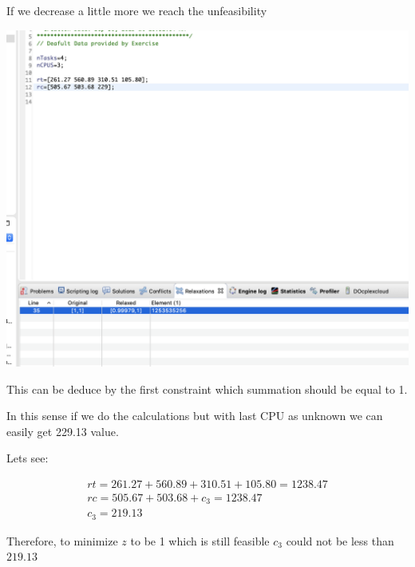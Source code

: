 \documentclass[12pt, a4paper]{article}
\begin{document}
If we decrease a little more we reach the unfeasibility

\includegraphics[width=\textwidth]{increase_unfesible}

This can be deduce by the first constraint which summation should be equal to 1.

In this sense if we do the calculations but with last CPU as unknown we can
easily get 229.13 value.

Lets see:

\begin{subequations}
  \begin{align}
  rt = 261.27 + 560.89 + 310.51 + 105.80 = 1238.47 \\
  rc = 505.67 + 503.68 + c_3 = 1238.47 \\
  c_3 = 219.13
  \end{align}
\end{subequations}

Therefore, to minimize $z$ to be 1 which is still feasible $c_3$ could not be
less than $219.13$
\end{document}
